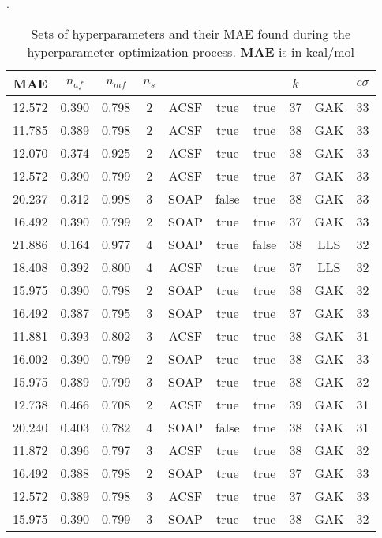 \documentclass[12pt]{article}
\begin{document}
\begin{table}[H]
	\centering
	\caption{Sets of hyperparameters and their MAE found during the hyperparameter optimization process. \textbf{MAE} is in kcal/mol}.
	\begin{tabular}{|c|c|c|c|c|c|c|c|c|c|}
		\hline
		\textbf{MAE}	& $n_{af}$ & $n_{mf}$ & $n_s$ & \codeword{ftype} & \codeword{norm_af} & \codeword{norm_mf} & $k$ & \codeword{model} & $c\sigma$	\\ \hline
		12.572	& 0.390	& 0.798	& 2	& ACSF	& true	& true	& 37	& GAK	& 33	\\ \hline
		11.785	& 0.389	& 0.798	& 2	& ACSF	& true	& true	& 38	& GAK	& 33	\\ \hline
		12.070	& 0.374	& 0.925	& 2	& ACSF	& true	& true	& 38	& GAK	& 33	\\ \hline
		12.572	& 0.390	& 0.799	& 2	& ACSF	& true	& true	& 37	& GAK	& 33	\\ \hline
		20.237	& 0.312	& 0.998	& 3	& SOAP	& false	& true	& 38	& GAK	& 33	\\ \hline
		16.492	& 0.390	& 0.799	& 2	& SOAP	& true	& true	& 37	& GAK	& 33	\\ \hline
		21.886	& 0.164	& 0.977	& 4	& SOAP	& true	& false	& 38	& LLS	& 32	\\ \hline
		18.408	& 0.392	& 0.800	& 4	& ACSF	& true	& true	& 37	& LLS	& 32	\\ \hline
		15.975	& 0.390	& 0.798	& 2	& SOAP	& true	& true	& 38	& GAK	& 32	\\ \hline
		16.492	& 0.387	& 0.795	& 3	& SOAP	& true	& true	& 37	& GAK	& 33	\\ \hline
		11.881	& 0.393	& 0.802	& 3	& ACSF	& true	& true	& 38	& GAK	& 31	\\ \hline
		16.002	& 0.390	& 0.799	& 2	& SOAP	& true	& true	& 38	& GAK	& 33	\\ \hline
		15.975	& 0.389	& 0.799	& 3	& SOAP	& true	& true	& 38	& GAK	& 32	\\ \hline
		12.738	& 0.466	& 0.708	& 2	& ACSF	& true	& true	& 39	& GAK	& 31	\\ \hline
		20.240	& 0.403	& 0.782	& 4	& SOAP	& false	& true	& 38	& GAK	& 31	\\ \hline
		11.872	& 0.396	& 0.797	& 3	& ACSF	& true	& true	& 38	& GAK	& 32	\\ \hline
		16.492	& 0.388	& 0.798	& 2	& SOAP	& true	& true	& 37	& GAK	& 33	\\ \hline
		12.572	& 0.389	& 0.798	& 3	& ACSF	& true	& true	& 37	& GAK	& 33	\\ \hline
		15.975	& 0.390	& 0.799	& 3	& SOAP	& true	& true	& 38	& GAK	& 32	\\ \hline

\end{tabular}
\end{table}
\end{document}
